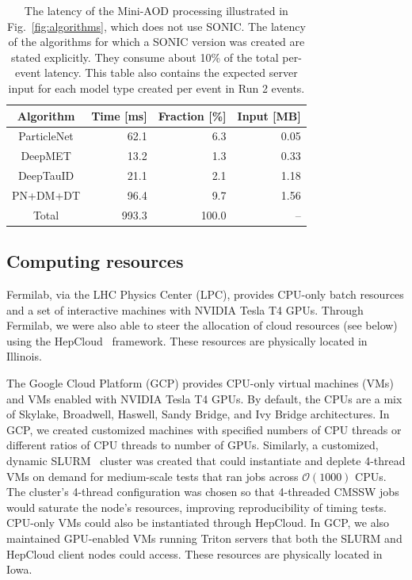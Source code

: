 \begin{table}[ht!]
\begin{center}
\begin{tabular}{c r r r}
 Algorithm & \multicolumn{1}{c}{Time [ms]} & \multicolumn{1}{c}{Fraction [\%]} & \multicolumn{1}{c}{Input [MB]}\\ %
 \hline
 ParticleNet & 62.1 & 6.3 & 0.05 \\
 DeepMET & 13.2 & 1.3 & 0.33 \\
 DeepTauID & 21.1 & 2.1 & 1.18 \\
 \hline
 PN+DM+DT & 96.4 & 9.7 & 1.56 \\ 
 \hline
 Total & 993.3 & 100.0 & -- \\ 
\end{tabular}
\caption{The latency of the Mini-AOD processing illustrated in Fig.~\ref{fig:algorithms}, which does not use SONIC. The latency of the algorithms for which a SONIC version was created are stated explicitly. They consume about 10\% of the total per-event latency. This table also contains the expected server input for each model type created per event in Run 2 \ttbar events.}
\label{table:SONIC_Algos}
\end{center}
\end{table}

\subsection{Computing resources}

Fermilab, via the LHC Physics Center (LPC), provides CPU-only batch resources and a set of interactive machines with NVIDIA Tesla T4 GPUs. Through Fermilab, we were also able to steer the allocation of cloud resources (see below) using the HepCloud~\cite{Holzman:2017jgg} framework. These resources are physically located in Illinois.

The Google Cloud Platform (GCP) provides CPU-only virtual machines (VMs) and VMs enabled with NVIDIA Tesla T4 GPUs. By default, the CPUs are a mix of Skylake, Broadwell, Haswell, Sandy Bridge, and Ivy Bridge architectures. In GCP, we created customized machines with specified numbers of CPU threads or different ratios of CPU threads to number of GPUs. Similarly, a customized, dynamic SLURM~\cite{slurm} cluster was created that could instantiate and deplete 4-thread VMs on demand for medium-scale tests that ran jobs across $\mathcal{O}(1000)$ CPUs. The cluster's 4-thread configuration was chosen so that 4-threaded CMSSW jobs would saturate the node's resources, improving reproducibility of timing tests. CPU-only VMs could also be instantiated through HepCloud. In GCP, we also maintained GPU-enabled VMs running Triton servers that both the SLURM and HepCloud client nodes could access. These resources are physically located in Iowa.

